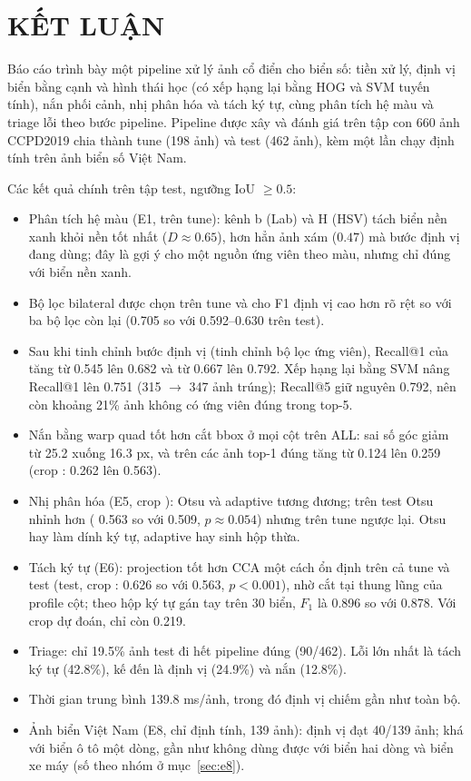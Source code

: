 \chapter{KẾT LUẬN}
\label{chap:conclusion}

Báo cáo trình bày một pipeline xử lý ảnh cổ điển cho biển số: tiền xử lý, định vị biển bằng cạnh và hình thái học (có xếp hạng lại bằng HOG và SVM tuyến tính), nắn phối cảnh, nhị phân hóa và tách ký tự, cùng phân tích hệ màu và triage lỗi theo bước pipeline. Pipeline được xây và đánh giá trên tập con 660 ảnh CCPD2019 chia thành tune (198 ảnh) và test (462 ảnh), kèm một lần chạy định tính trên ảnh biển số Việt Nam.

Các kết quả chính trên tập test, ngưỡng IoU $\geq 0.5$:
\begin{itemize}
  \item Phân tích hệ màu (E1, trên tune): kênh b (Lab) và H (HSV) tách biển nền xanh khỏi nền tốt nhất ($D\approx 0.65$), hơn hẳn ảnh xám ($0.47$) mà bước định vị đang dùng; đây là gợi ý cho một nguồn ứng viên theo màu, nhưng chỉ đúng với biển nền xanh.
  \item Bộ lọc bilateral được chọn trên tune và cho F1 định vị cao hơn rõ rệt so với ba bộ lọc còn lại (0.705 so với 0.592--0.630 trên test).
  \item Sau khi tinh chỉnh bước định vị (tinh chỉnh bộ lọc ứng viên), Recall@1 của  tăng từ 0.545 lên 0.682 và  từ 0.667 lên 0.792. Xếp hạng lại bằng SVM nâng Recall@1 lên 0.751 (315 $\to$ 347 ảnh trúng); Recall@5 giữ nguyên 0.792, nên còn khoảng 21\% ảnh không có ứng viên đúng trong top-5.
  \item Nắn bằng warp quad tốt hơn cắt bbox ở mọi cột trên ALL: sai số góc giảm từ 25.2 xuống 16.3 px, và  trên các ảnh top-1 đúng tăng từ 0.124 lên 0.259 (crop : 0.262 lên 0.563).
  \item Nhị phân hóa (E5, crop ): Otsu và adaptive tương đương; trên test Otsu nhỉnh hơn ( 0.563 so với 0.509, $p\approx 0.054$) nhưng trên tune ngược lại. Otsu hay làm dính ký tự, adaptive hay sinh hộp thừa.
  \item Tách ký tự (E6): projection tốt hơn CCA một cách ổn định trên cả tune và test (test, crop : 0.626 so với 0.563, $p<0.001$), nhờ cắt tại thung lũng của profile cột; theo hộp ký tự gán tay trên 30 biển, $F_1$ là 0.896 so với 0.878. Với crop dự đoán,  chỉ còn 0.219.
  \item Triage: chỉ 19.5\% ảnh test đi hết pipeline đúng (90/462). Lỗi lớn nhất là tách ký tự (42.8\%), kế đến là định vị (24.9\%) và nắn (12.8\%).
  \item Thời gian trung bình 139.8 ms/ảnh, trong đó định vị chiếm gần như toàn bộ.
  \item Ảnh biển Việt Nam (E8, chỉ định tính, 139 ảnh): định vị đạt 40/139 ảnh; khá với biển ô tô một dòng, gần như không dùng được với biển hai dòng và biển xe máy (số theo nhóm ở mục~\ref{sec:e8}).
\end{itemize}

